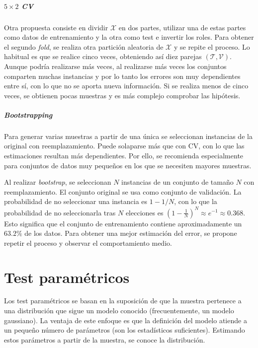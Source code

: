 \paragraph{$5 \times 2$ CV} Otra propuesta consiste en 
dividir $\mathcal{X}$ en dos partes, utilizar una de estas 
partes como datos de entrenamiento y la otra como test e 
invertir los roles. Para obtener el segundo \textit{fold}, se 
realiza otra partición aleatoria de $\mathcal{X}$ y se repite 
el proceso. Lo habitual es que se realice cinco veces, 
obteniendo así diez parejas $(\mathcal{T}, \mathcal{V})$. 
Aunque podría realizarse más veces, al realizarse más veces 
los conjuntos comparten muchas instancias y por lo tanto los 
errores son muy dependientes entre sí, con lo que no se 
aporta nueva información. Si se realiza menos de cinco veces, 
se obtienen pocas muestras y es más complejo comprobar las 
hipótesis.

\paragraph{\textit{Bootstrapping}} Para generar varias 
muestras a partir de una única se seleccionan instancias de 
la original con reemplazamiento. Puede solaparse más que con 
CV, con lo que las estimaciones resultan más dependientes. 
Por ello, se recomienda especialmente para conjuntos de datos 
muy pequeños en los que se necesiten mayores muestras. 

	Al realizar \textit{bootstrap}, se seleccionan $N$ 
instancias de un conjunto de tamaño $N$ con reemplazamiento. 
El conjunto original se usa como conjunto de validación. La 
probabilidad de no seleccionar una instancia es $1-1/N$, con 
lo que la probabilidad de no seleccionarla tras $N$ 
elecciones es $\left(1- \frac{1}{N}\right)^N \approx e^{-1} 
\approx 0.368$. Esto significa que el conjunto de 
entrenamiento contiene aproximadamente un $63.2\%$ de los 
datos. Para obtener una mejor estimación del error, se 
propone repetir el proceso y observar el comportamiento 
medio.
	
	
\chapter{Test paramétricos}
\label{chapter:test_parametricos}

	Los test paramétricos se basan en la suposición de que la
muestra pertenece a una distribución que sigue un modelo 
conocido (frecuentemente, un modelo gaussiano). La ventaja de 
este enfoque es que la definición del modelo atiende a un 
pequeño número de parámetros (son los estadísticos 
suficientes). Estimando estos parámetros a partir de la 
muestra, se conoce la distribución. 
	
